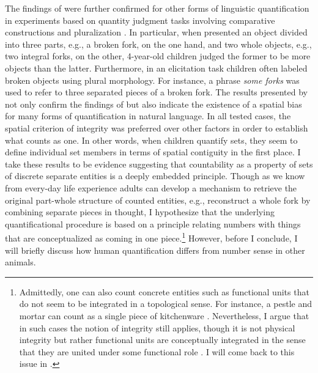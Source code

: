 The findings of \citeauthor{shipley_shepperson1990countable} were further confirmed for other forms of linguistic quantification in experiments based on quantity judgment tasks involving comparative constructions and pluralization \citep{melgoza_pogue_barner2008broken}. In particular, when presented an object divided into three parts, e.g., a broken fork, on the one hand, and two whole objects, e.g., two integral forks, on the other, 4-year-old children judged the former to be more objects than the latter. Furthermore, in an elicitation task children often labeled broken objects using plural morphology. For instance, a phrase \textit{some forks} was used to refer to three separated pieces of a broken fork. The results presented by \citeauthor{melgoza_pogue_barner2008broken} not only confirm the findings of \citeauthor{shipley_shepperson1990countable} but also indicate the existence of a spatial bias for many forms of quantification in natural language. In all tested cases, the spatial criterion of integrity was preferred over other factors in order to establish what counts as one. In other words, when children quantify sets, they seem to define individual set members in terms of spatial contiguity in the first place. I take these results to be  evidence suggesting that countability as a property of sets of discrete separate entities is a deeply embedded principle. Though as we know from every-day life experience adults can develop a mechanism to retrieve the original part-whole structure of counted entities, e.g., reconstruct a whole fork by combining separate pieces in thought, I hypothesize that the underlying quantificational procedure is based on a principle relating numbers with things that are conceptualized as coming in one piece.{\footnote{Admittedly, one can also count concrete entities such as functional units that do not seem to be integrated in a topological sense. For instance, a pestle and mortar can count as a single piece of kitchenware \citep{sutton_filip2016counting}. Nevertheless, I argue that in such cases the notion of integrity still applies, though it is not physical integrity but rather functional units are conceptually integrated in the sense that they are united under some functional role \citep[see][]{grimm_levin2017artifacts}. I will come back to this issue in .\label{fn:artifacts}}} However, before I conclude, I will briefly discuss how human quantification differs from number sense in other animals.

